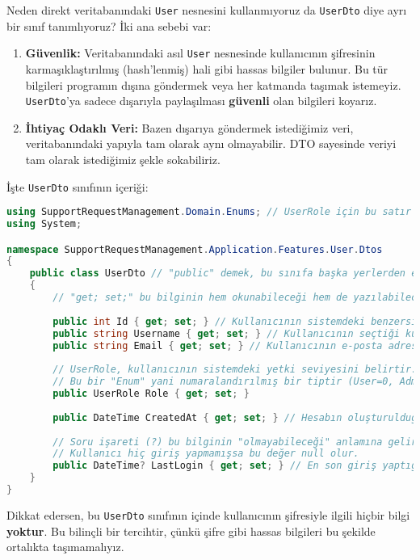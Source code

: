 \documentclass[11pt, a4paper]{article}
\begin{document}
Neden direkt veritabanındaki \texttt{User} nesnesini kullanmıyoruz da \texttt{UserDto} diye ayrı bir sınıf tanımlıyoruz? İki ana sebebi var:

\begin{enumerate}
    \item \textbf{Güvenlik:} Veritabanındaki asıl \texttt{User} nesnesinde kullanıcının şifresinin karmaşıklaştırılmış (hash'lenmiş) hali gibi hassas bilgiler bulunur. Bu tür bilgileri programın dışına göndermek veya her katmanda taşımak istemeyiz. \texttt{UserDto}'ya sadece dışarıyla paylaşılması \textbf{güvenli} olan bilgileri koyarız.
    \item \textbf{İhtiyaç Odaklı Veri:} Bazen dışarıya göndermek istediğimiz veri, veritabanındaki yapıyla tam olarak aynı olmayabilir. DTO sayesinde veriyi tam olarak istediğimiz şekle sokabiliriz.
\end{enumerate}

İşte \texttt{UserDto} sınıfının içeriği:

\begin{lstlisting}[language=C#]
using SupportRequestManagement.Domain.Enums; // UserRole için bu satır gerekli
using System;

namespace SupportRequestManagement.Application.Features.User.Dtos
{
    public class UserDto // "public" demek, bu sınıfa başka yerlerden erişilebilir demek
    {
        // "get; set;" bu bilginin hem okunabileceği hem de yazılabileceği anlamına gelir
        
        public int Id { get; set; } // Kullanıcının sistemdeki benzersiz numarası (kimlik numarası gibi)
        public string Username { get; set; } // Kullanıcının seçtiği kullanıcı adı
        public string Email { get; set; } // Kullanıcının e-posta adresi
        
        // UserRole, kullanıcının sistemdeki yetki seviyesini belirtir.
        // Bu bir "Enum" yani numaralandırılmış bir tiptir (User=0, Admin=1 gibi)
        public UserRole Role { get; set; } 
        
        public DateTime CreatedAt { get; set; } // Hesabın oluşturulduğu tarih ve saat
        
        // Soru işareti (?) bu bilginin "olmayabileceği" anlamına gelir (null olabilir)
        // Kullanıcı hiç giriş yapmamışsa bu değer null olur.
        public DateTime? LastLogin { get; set; } // En son giriş yaptığı tarih ve saat
    }
}
\end{lstlisting}

Dikkat edersen, bu \texttt{UserDto} sınıfının içinde kullanıcının şifresiyle ilgili hiçbir bilgi \textbf{yoktur}. Bu bilinçli bir tercihtir, çünkü şifre gibi hassas bilgileri bu şekilde ortalıkta taşımamalıyız.
\end{document}
